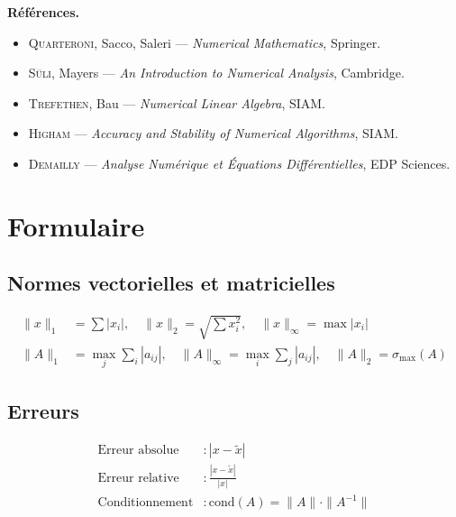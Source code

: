 \documentclass[12pt,a4paper,twoside]{book}
\theoremstyle{definition}
\theoremstyle{plain}
\theoremstyle{remark}
\newcommand{\cond}{\mathrm{cond}}
\begin{document}
\medskip
\textbf{R\'ef\'erences.}
\begin{itemize}
\item \textsc{Quarteroni}, Sacco, Saleri --- \emph{Numerical Mathematics}, Springer.
\item \textsc{S\"uli}, Mayers --- \emph{An Introduction to Numerical Analysis}, Cambridge.
\item \textsc{Trefethen}, Bau --- \emph{Numerical Linear Algebra}, SIAM.
\item \textsc{Higham} --- \emph{Accuracy and Stability of Numerical Algorithms}, SIAM.
\item \textsc{Demailly} --- \emph{Analyse Num\'erique et \'Equations Diff\'erentielles}, EDP Sciences.
\end{itemize}

\mainmatter












\backmatter
\appendix
\chapter{Formulaire}
\label{app:formulaire}

\section{Normes vectorielles et matricielles}
\begin{align}
\|x\|_1 &= \sum|x_i|, \quad \|x\|_2=\sqrt{\sum x_i^2}, \quad \|x\|_\infty=\max|x_i| \\
\|A\|_1 &= \max_j\sum_i|a_{ij}|, \quad \|A\|_\infty=\max_i\sum_j|a_{ij}|, \quad \|A\|_2=\sigma_{\max}(A)
\end{align}

\section{Erreurs}
\begin{align}
\text{Erreur absolue} &: |x-\tilde{x}| \\
\text{Erreur relative} &: \frac{|x-\tilde{x}|}{|x|} \\
\text{Conditionnement} &: \cond(A)=\|A\|\cdot\|A^{-1}\|
\end{align}
\end{document}
